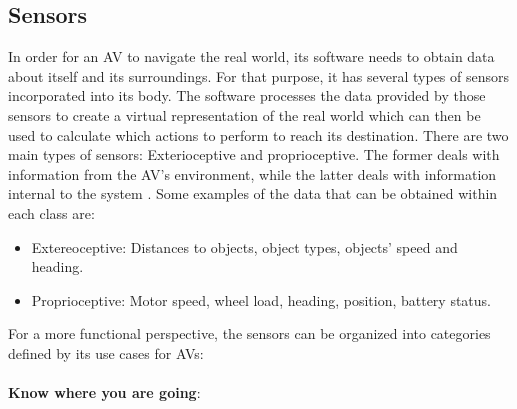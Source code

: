 \documentclass[11pt]{article}
\begin{document}
\subsection{Sensors}
In order for an AV to navigate the real world, its software needs to obtain data about itself and its surroundings. For that purpose, it has several types of sensors incorporated into its body. The software processes the data provided by those sensors to create a virtual representation of the real world which can then be used to calculate which actions to perform to reach its destination. There are two main types of sensors: Exterioceptive and proprioceptive. The former deals with information from the AV's environment, while the latter deals with information internal to the system \cite{BeesonTexas09}. Some examples of the data that can be obtained within each class are:
\begin{itemize}
	\item Extereoceptive: Distances to objects, object types, objects' speed and heading.
	\item Proprioceptive: Motor speed, wheel load, heading, position, battery status.
\end{itemize}
For a more functional perspective, the sensors can be organized into categories defined by its use cases for AVs:
\\\\\textbf{Know where you are going}:
\end{document}
